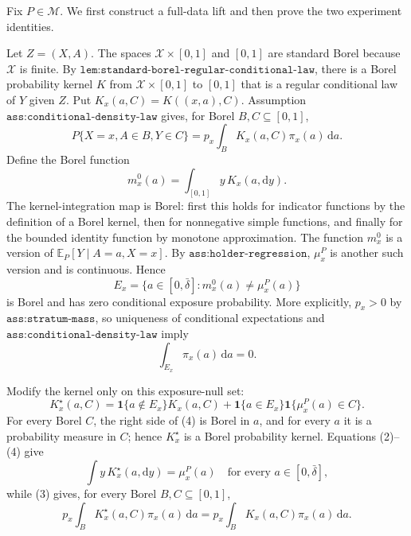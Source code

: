 Fix \(P\in\mathcal M\).  We first construct a full-data lift and then prove the two experiment identities.

Let \(Z=(X,A)\).  The spaces \(\mathcal X\times[0,1]\) and \([0,1]\) are standard Borel because \(\mathcal X\) is finite.  By \(\texttt{lem:standard-borel-regular-conditional-law}\), there is a Borel probability kernel \(K\) from \(\mathcal X\times[0,1]\) to \([0,1]\) that is a regular conditional law of \(Y\) given \(Z\).  Put \(K_x(a,C)=K((x,a),C)\).  Assumption \(\texttt{ass:conditional-density-law}\) gives, for Borel \(B,C\subseteq[0,1]\),
\[
 P\{X=x,A\in B,Y\in C\}
 =p_x\int_B K_x(a,C)\pi_x(a)\,\mathrm da.
 \tag{1}
\]
Define the Borel function
\[
 m_x^0(a)=\int_{[0,1]}y\,K_x(a,\mathrm dy).
\]
The kernel-integration map is Borel: first this holds for indicator functions by the definition of a Borel kernel, then for nonnegative simple functions, and finally for the bounded identity function by monotone approximation.  The function \(m_x^0\) is a version of \(\mathbb E_P[Y\mid A=a,X=x]\).  By \(\texttt{ass:holder-regression}\), \(\mu_x^P\) is another such version and is continuous.  Hence
\[
 E_x=\{a\in[0,\bar\delta]:m_x^0(a)\ne\mu_x^P(a)\}
 \tag{2}
\]
is Borel and has zero conditional exposure probability.  More explicitly, \(p_x>0\) by \(\texttt{ass:stratum-mass}\), so uniqueness of conditional expectations and \(\texttt{ass:conditional-density-law}\) imply
\[
 \int_{E_x}\pi_x(a)\,\mathrm da=0.
 \tag{3}
\]

Modify the kernel only on this exposure-null set:
\[
 K_x^\star(a,C)
 =\mathbf 1\{a\notin E_x\}K_x(a,C)
  +\mathbf 1\{a\in E_x\}\mathbf 1\{\mu_x^P(a)\in C\}.
 \tag{4}
\]
For every Borel \(C\), the right side of (4) is Borel in \(a\), and for every \(a\) it is a probability measure in \(C\); hence \(K_x^\star\) is a Borel probability kernel.  Equations (2)--(4) give
\[
 \int y\,K_x^\star(a,\mathrm dy)=\mu_x^P(a)
 \quad\text{for every }a\in[0,\bar\delta],
 \tag{5}
\]
while (3) gives, for every Borel \(B,C\subseteq[0,1]\),
\[
 p_x\int_BK_x^\star(a,C)\pi_x(a)\,\mathrm da
 =p_x\int_BK_x(a,C)\pi_x(a)\,\mathrm da.
 \tag{6}
\]

